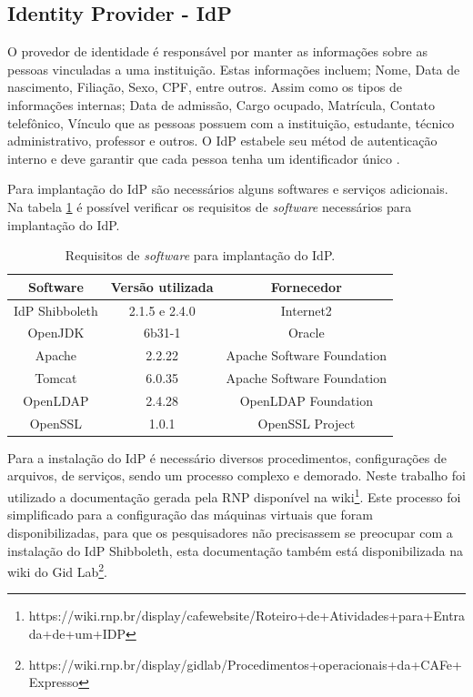 \subsection{Identity Provider - IdP}
\label{ss_c4_inst_idp}

O provedor de identidade é responsável por manter as informações sobre as pessoas vinculadas a uma instituição. Estas informações incluem; Nome, Data de nascimento, Filiação, Sexo, CPF, entre outros. Assim como os tipos de informações internas; Data de admissão, Cargo ocupado, Matrícula, Contato telefônico, Vínculo que as pessoas possuem com a instituição, estudante, técnico administrativo, professor e outros. O IdP estabele seu métod de autenticação interno e deve garantir que cada pessoa tenha um identificador único \cite{moreira:11}.

Para implantação do IdP são necessários alguns softwares e serviços adicionais. Na tabela \ref{tab_2} é possível verificar os requisitos de \textit{software} necessários para implantação do IdP.

\begin{table}[!htpb]
   \begin{small}
	\centering
	\begin{tabular}{|c|c|c|} \hline
		Software & Versão utilizada & Fornecedor \\ \hline
		IdP Shibboleth & 2.1.5 e 2.4.0 & Internet2\\ \hline
		OpenJDK & 6b31-1 & Oracle\\ \hline
		Apache & 2.2.22 & Apache Software Foundation\\ \hline
		Tomcat & 6.0.35 & Apache Software Foundation\\ \hline
		OpenLDAP & 2.4.28 & OpenLDAP Foundation\\ \hline
		OpenSSL & 1.0.1 & OpenSSL Project\\ \hline
	\end{tabular}
	\caption{Requisitos de \textit{software} para implantação do IdP.}
	\label{tab_2} 	
  \end{small}
\end{table}

Para a instalação do IdP é necessário diversos procedimentos, configurações de arquivos, de serviços, sendo um processo complexo e demorado. Neste trabalho foi utilizado a documentação gerada pela RNP disponível na wiki\footnote{https://wiki.rnp.br/display/cafewebsite/Roteiro+de+Atividades+para+Entrada+de+um+IDP}. Este processo foi simplificado para a configuração das máquinas virtuais que foram disponibilizadas, para que os pesquisadores não precisassem se preocupar com a instalação do IdP Shibboleth, esta documentação também está disponibilizada na wiki do Gid Lab\footnote{https://wiki.rnp.br/display/gidlab/Procedimentos+operacionais+da+CAFe+Expresso}.

